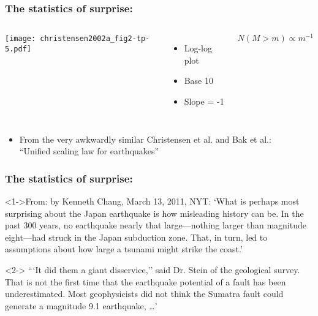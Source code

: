 \begin{frame}

\frametitle{The statistics of surprise:}


\begin{block}{}
  \begin{columns}
    \texttt{[image: christensen2002a\_fig2-tp-5.pdf]}
    \begin{itemize}
    \item 
      Log-log plot
    \item 
      Base 10
    \item 
      Slope = -1
    \end{itemize}
    $N(M>m) \propto m^{-1}$
  \end{columns}
\end{block}

\begin{block}{}
  \begin{itemize}
  \item 
    From  the very awkwardly similar Christensen et al. and Bak et al.:\\
    ``Unified scaling law for earthquakes''\cite{christensen2002a,bak2002a}
  \end{itemize}
\end{block}

\end{frame}

\begin{frame}

\frametitle{The statistics of surprise:}

\begin{block}<1->{From:
by Kenneth Chang, March 13, 2011, NYT:
}
`What is perhaps most surprising about the Japan earthquake is how
misleading history can be. In the past 300 years, no earthquake nearly
that large---nothing larger than magnitude eight---had struck in the
Japan subduction zone. That, in turn, led to assumptions about how
large a tsunami might strike the coast.'
\end{block}

\begin{block}<2->{}
```It did them a giant disservice,'' said Dr. Stein of the geological
survey. That is not the first time that the earthquake potential of a
fault has been underestimated. Most geophysicists did not think the
Sumatra fault could generate a magnitude 9.1 earthquake, \ldots'
\end{block}


\end{frame}


